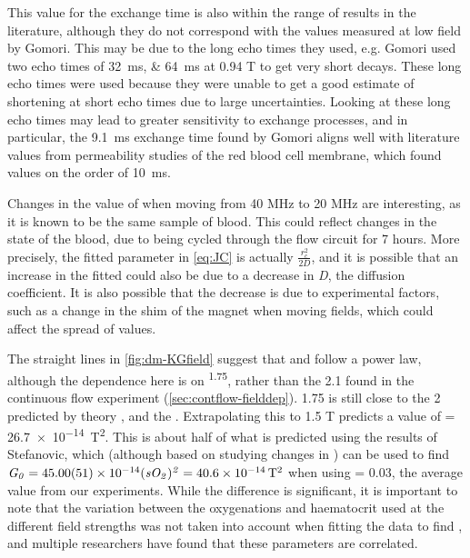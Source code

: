 This value for the exchange time is also within the range of results in the literature, although they do not correspond with the values measured at low field by Gomori\cite{GomoriNMRRelaxationTimes1987}.
This may be due to the long echo times they used, e.g. Gomori used two echo times of \SIlist{32;64}{ms} at 0.94 T to get very short \Ttwo decays.
These long echo times were used because they were unable to get a good estimate of \Ttwo shortening at short echo times due to large uncertainties.
Looking at these long echo times may lead to greater sensitivity to exchange processes, and in particular, the \SI{9.1}{ms} exchange time found by Gomori aligns well with literature values from permeability studies of the red blood cell membrane, which found values on the order of \SI{10}{ms}\cite{Herbstreviewwaterdiffusion1989}.

Changes in the value of \rc when moving from 40 MHz to 20 MHz are interesting, as it is known to be the same sample of blood.
This could reflect changes in the state of the blood, due to being cycled through the flow circuit for 7 hours.
More precisely, the fitted parameter in \autoref{eq:JC} is actually $\mathit{\frac{r_c^2}{2D}}$, and it is possible that an increase in the fitted \rc could also be due to a decrease in \textit{D}, the diffusion coefficient.
It is also possible that the decrease is due to experimental factors, such as a change in the shim of the magnet when moving fields, which could affect the spread of \Ttwo values.

The straight lines in \autoref{fig:dm-KGfield} suggest that \Kzero and \Gzero follow a power law, although the dependence here is on \Bzero\textsuperscript{1.75}, rather than the \num{2.1} found in the continuous flow experiment (\autoref{sec:contflow-fielddep}).
1.75 is still close to the 2 predicted by theory \cite[Eq. 52-54]{JensenNMRrelaxationtissues2000}, and the .
Extrapolating this to 1.5 T predicts a value of \Gzero = \SI{26.7e-14}{T^2}.
This is about half of what is predicted using the results of Stefanovic, which (although based on studying changes in \SOtwo) can be used to find $\mathit{G_0} = \num{45\pm0.51e-14}  \mathit{(sO_2)^2} = \SI{40.6e-14}{T^2}$ when using \SOtwo = 0.03, the average value from our experiments.
While the difference is significant, it is important to note that the variation between the oxygenations and haematocrit used at the different field strengths was not taken into account when fitting the data to find \Gzero, and multiple researchers \cite{StefanovicHumanwholebloodrelaxometry2004,ChenHumanwholeblood2009,GardenerDependencebloodR22010} have found that these parameters are correlated.

